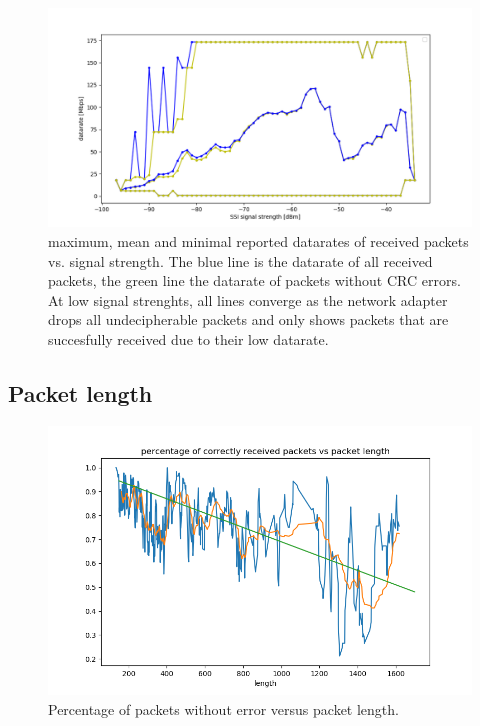 \documentclass{article}
\begin{document}
\begin{figure}
		\includegraphics[width=\textwidth]{figures/datarate_signal.png}
		\caption{maximum, mean and minimal reported datarates of received packets vs. signal strength. The blue line is the datarate of all received packets, the green line the datarate of packets without CRC errors. At low signal strenghts, all lines converge as the network adapter drops all undecipherable packets and only shows packets that are succesfully received due to their low datarate.}
		\label{fig:datasignal}
\end{figure}

\subsection{Packet length}
\begin{figure}
		\includegraphics[width=\textwidth]{figures/length.png}
		\caption{Percentage of packets without error versus packet length.}
		\label{fig:datasignal}
\end{figure}


\printbibliography
\end{document}
